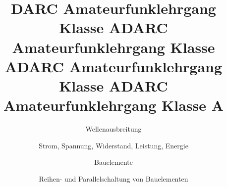 \documentclass[aspectratio = 169]{beamer}
\begin{document}

\title{DARC Amateurfunklehrgang Klasse A}
\author{Wellenausbreitung}
\begin{frame}
\maketitle
\end{frame}













\title{DARC Amateurfunklehrgang Klasse A}
\author{Strom, Spannung, Widerstand, Leistung, Energie}
\begin{frame}
\maketitle
\end{frame}








\title{DARC Amateurfunklehrgang Klasse A}
\author{Bauelemente}
\begin{frame}
\maketitle
\end{frame}









\title{DARC Amateurfunklehrgang Klasse A}
\author{Reihen- und Parallelschaltung von Bauelementen}
\begin{frame}
\maketitle
\end{frame}





\end{document}
